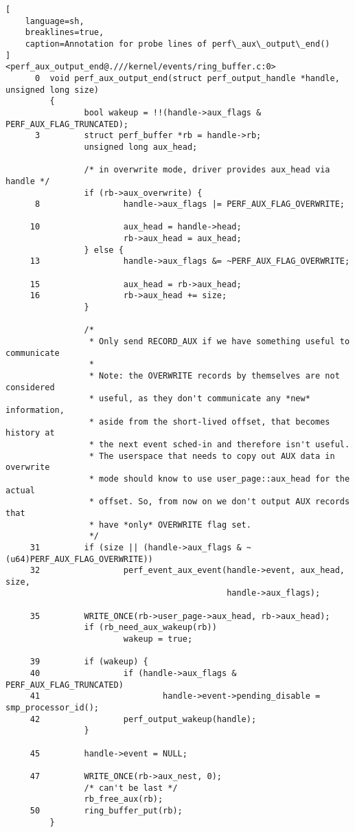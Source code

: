 \documentclass[11pt]{diazessay} %
\begin{document}
\begin{lstlisting}[
  	language=sh,
	breaklines=true,
	caption=Annotation for probe lines of perf\_aux\_output\_end()
]
<perf_aux_output_end@.///kernel/events/ring_buffer.c:0>
      0  void perf_aux_output_end(struct perf_output_handle *handle, unsigned long size)
         {
                bool wakeup = !!(handle->aux_flags & PERF_AUX_FLAG_TRUNCATED);
      3         struct perf_buffer *rb = handle->rb;
                unsigned long aux_head;

                /* in overwrite mode, driver provides aux_head via handle */
                if (rb->aux_overwrite) {
      8                 handle->aux_flags |= PERF_AUX_FLAG_OVERWRITE;

     10                 aux_head = handle->head;
                        rb->aux_head = aux_head;
                } else {
     13                 handle->aux_flags &= ~PERF_AUX_FLAG_OVERWRITE;

     15                 aux_head = rb->aux_head;
     16                 rb->aux_head += size;
                }

                /*
                 * Only send RECORD_AUX if we have something useful to communicate
                 *
                 * Note: the OVERWRITE records by themselves are not considered
                 * useful, as they don't communicate any *new* information,
                 * aside from the short-lived offset, that becomes history at
                 * the next event sched-in and therefore isn't useful.
                 * The userspace that needs to copy out AUX data in overwrite
                 * mode should know to use user_page::aux_head for the actual
                 * offset. So, from now on we don't output AUX records that
                 * have *only* OVERWRITE flag set.
                 */
     31         if (size || (handle->aux_flags & ~(u64)PERF_AUX_FLAG_OVERWRITE))
     32                 perf_event_aux_event(handle->event, aux_head, size,
                                             handle->aux_flags);

     35         WRITE_ONCE(rb->user_page->aux_head, rb->aux_head);
                if (rb_need_aux_wakeup(rb))
                        wakeup = true;

     39         if (wakeup) {
     40                 if (handle->aux_flags & PERF_AUX_FLAG_TRUNCATED)
     41                         handle->event->pending_disable = smp_processor_id();
     42                 perf_output_wakeup(handle);
                }

     45         handle->event = NULL;

     47         WRITE_ONCE(rb->aux_nest, 0);
                /* can't be last */
                rb_free_aux(rb);
     50         ring_buffer_put(rb);
         }
\end{lstlisting}
\end{document}
